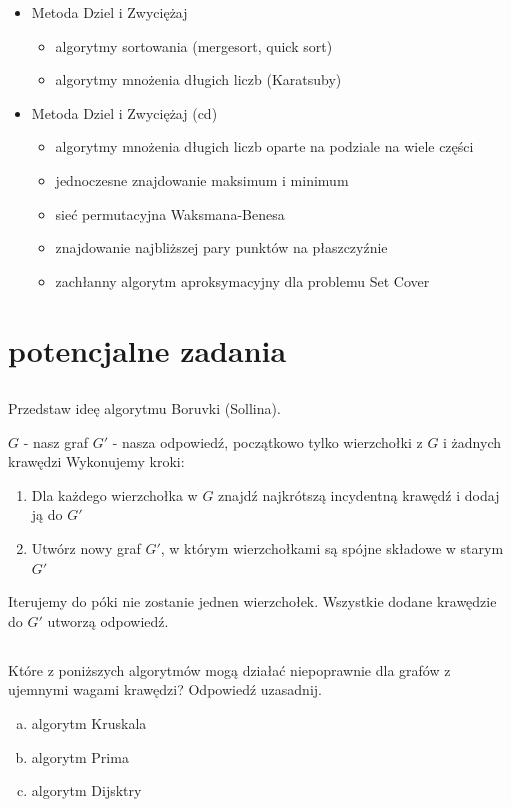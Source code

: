\documentclass[svgnames]{report}
\begin{document}
\begin{itemize}
\item Metoda Dziel i Zwyciężaj
\begin{itemize}
	\item algorytmy sortowania (mergesort, quick sort)
	\item algorytmy mnożenia długich liczb (Karatsuby)
\end{itemize}

\item Metoda Dziel i Zwyciężaj (cd)
\begin{itemize}
	\item algorytmy mnożenia długich liczb oparte na podziale na wiele części
	\item jednoczesne znajdowanie maksimum i minimum
	\item sieć permutacyjna Waksmana-Benesa
	\item znajdowanie najbliższej pary punktów na płaszczyźnie
	\item zachłanny algorytm aproksymacyjny dla problemu Set Cover
\end{itemize}
\end{itemize}

\chapter{potencjalne zadania}
\section{}
\begin{framed}
Przedstaw ideę algorytmu Boruvki (Sollina).
\end{framed}
$G$ - nasz graf
$G'$ - nasza odpowiedź, początkowo tylko wierzchołki z $G$ i żadnych krawędzi
Wykonujemy kroki:
\begin{enumerate}
\item Dla każdego wierzchołka w $G$ znajdź najkrótszą incydentną krawędź i dodaj ją do $G'$
\item Utwórz nowy graf $G'$, w którym wierzchołkami są spójne składowe w starym $G'$
 \end{enumerate}
Iterujemy do póki nie zostanie jednen wierzchołek. Wszystkie dodane krawędzie do $G'$ utworzą odpowiedź.
\section{}
\begin{framed}
Które z poniższych algorytmów mogą działać niepoprawnie dla grafów z ujemnymi wagami krawędzi? Odpowiedź uzasadnij.
\begin{enumerate}[a)]
	\item algorytm Kruskala
	\item algorytm Prima
	\item algorytm Dijsktry
\end{enumerate}
\end{framed}
\end{document}
